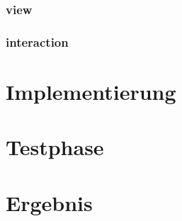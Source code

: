 \documentclass[18pt]{beamer}
\begin{document}
	\subsubsection{view}
		
	\subsubsection{interaction}
		
\fi


\section{Implementierung}
    \subsection{}
        
    \subsection{}
        

\section{Testphase}
    \subsection{}
        
    \subsection{}
        
    \subsection{}
        

\section{Ergebnis}
    \subsection{}
        
    \subsection{}
        
\end{document}
